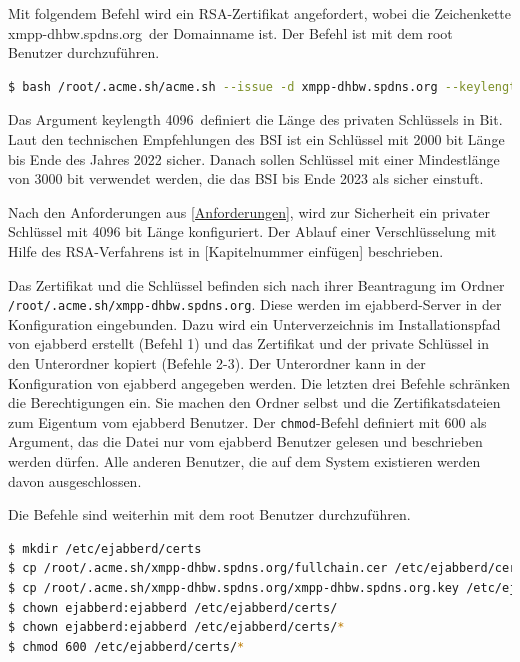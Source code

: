 \documentclass[a4paper,titlepage,halfparskip,12pt]{scrreprt}
\begin{document}
\begin{onehalfspacing}
Mit folgendem Befehl wird ein \ac{RSA}-Zertifikat angefordert, wobei die Zeichenkette \glqq xmpp-dhbw.spdns.org\grqq\ der Domainname ist. Der Befehl ist mit dem root Benutzer durchzuführen.

\bigskip

\begin{lstlisting}[language=bash, caption={Installation des Let's Encrpt Zertifikats durch den ACME-Client}]
$ bash /root/.acme.sh/acme.sh --issue -d xmpp-dhbw.spdns.org --keylength 4096 --standalone
\end{lstlisting}

Das Argument \glqq keylength 4096\grqq\ definiert die Länge des privaten Schlüssels in Bit. Laut den technischen Empfehlungen des \ac{BSI} ist ein Schlüssel mit 2000 bit Länge bis Ende des Jahres 2022 sicher. Danach sollen Schlüssel mit einer Mindestlänge von 3000 bit verwendet werden, die das \ac{BSI} bis Ende 2023 als sicher einstuft.\cite{empfehlungBSI}

Nach den Anforderungen aus \autoref{Anforderungen}, wird zur Sicherheit ein privater Schlüssel mit 4096 bit Länge konfiguriert. Der Ablauf einer Verschlüsselung mit Hilfe des \ac{RSA}-Verfahrens ist in [Kapitelnummer einfügen] beschrieben.

Das Zertifikat und die Schlüssel befinden sich nach ihrer Beantragung im Ordner \texttt{/root/.acme.sh/xmpp-dhbw.spdns.org}. Diese werden im ejabberd-Server in der Konfiguration eingebunden. Dazu wird ein Unterverzeichnis im Installationspfad von ejabberd erstellt (Befehl 1) und das Zertifikat und der private Schlüssel in den Unterordner kopiert (Befehle 2-3). Der Unterordner kann in der Konfiguration von ejabberd angegeben werden.
Die letzten drei Befehle schränken die Berechtigungen ein. Sie machen den Ordner selbst und die Zertifikatsdateien zum Eigentum vom ejabberd Benutzer. Der \texttt{chmod}-Befehl definiert mit 600 als Argument, das die Datei nur vom ejabberd Benutzer gelesen und beschrieben werden dürfen. Alle anderen Benutzer, die auf dem System existieren werden davon ausgeschlossen.

Die Befehle sind weiterhin mit dem root Benutzer durchzuführen.

\bigskip

\begin{lstlisting}[language=bash, caption={Kopieren der Zertifikate in ein Unterverzeichnis und Einschränkung der Rechte},label={lst:ejabberdCerts}]
$ mkdir /etc/ejabberd/certs
$ cp /root/.acme.sh/xmpp-dhbw.spdns.org/fullchain.cer /etc/ejabberd/certs/fullchain.pem
$ cp /root/.acme.sh/xmpp-dhbw.spdns.org/xmpp-dhbw.spdns.org.key /etc/ejabberd/certs/
$ chown ejabberd:ejabberd /etc/ejabberd/certs/
$ chown ejabberd:ejabberd /etc/ejabberd/certs/*
$ chmod 600 /etc/ejabberd/certs/*
\end{lstlisting}


\end{onehalfspacing}
\end{document}
